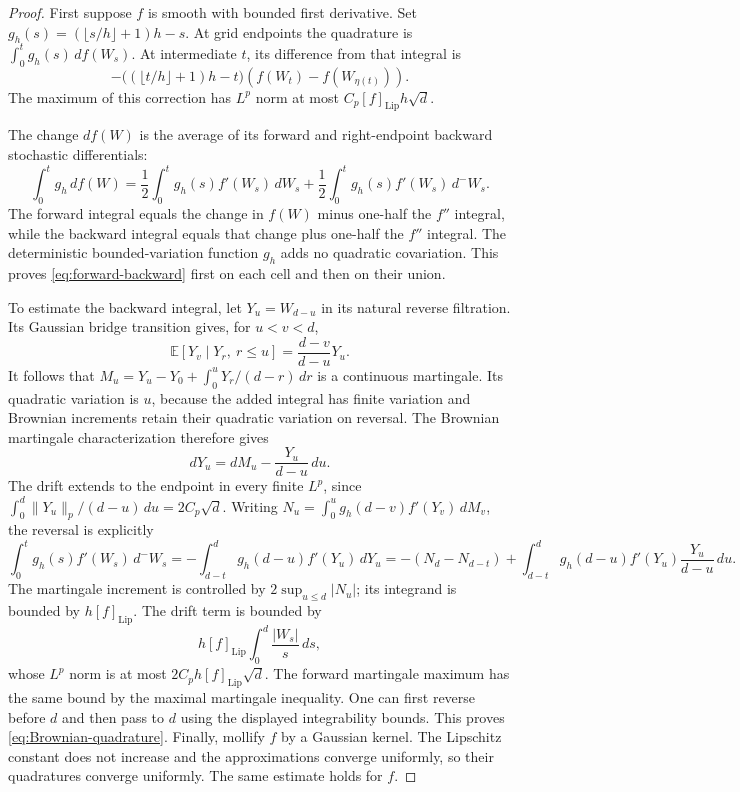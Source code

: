 \documentclass[11pt]{article}
\theoremstyle{remark}
\newcommand{\E}{\mathbb E}
\newcommand{\norm}[1]{\lVert#1\rVert}
\newcommand{\abs}[1]{\lvert#1\rvert}
\begin{document}
\begin{proof}
First suppose \(f\) is smooth with bounded first derivative.
Set \(g_h(s)=(\lfloor s/h\rfloor+1)h-s\).
At grid endpoints the quadrature is \(\int_0^t g_h(s)\,df(W_s)\).
At intermediate \(t\), its difference from that integral is
\[
 -\bigl((\lfloor t/h\rfloor+1)h-t\bigr)
          (f(W_t)-f(W_{\eta(t)})).
\]
The maximum of this correction has \(L^p\) norm at most
\(C_p[f]_{\mathrm{Lip}}h\sqrt d\).

The change \(df(W)\) is the average of its forward and right-endpoint
backward stochastic differentials:
\begin{equation}\label{eq:forward-backward}
 \int_0^t g_h\,df(W)
 =\frac12\int_0^t g_h(s)f'(W_s)\,dW_s
  +\frac12\int_0^t g_h(s)f'(W_s)\,d^-W_s.
\end{equation}
The forward integral equals the change in \(f(W)\) minus
one-half the \(f''\) integral, while the backward integral equals that
change plus one-half the \(f''\) integral. The deterministic
bounded-variation function \(g_h\) adds no quadratic covariation.
This proves \eqref{eq:forward-backward} first on each cell and then
on their union.

To estimate the backward integral, let \(Y_u=W_{d-u}\) in its natural
reverse filtration. Its Gaussian bridge transition gives, for \(u<v<d\),
\[
 \E[Y_v\mid Y_r,\ r\le u]=\frac{d-v}{d-u}Y_u.
\]
It follows that
\(M_u=Y_u-Y_0+\int_0^uY_r/(d-r)\,dr\) is a continuous martingale.
Its quadratic variation is \(u\), because the added integral has
finite variation and Brownian increments retain their quadratic
variation on reversal. The Brownian martingale characterization
therefore gives
\[
 dY_u=dM_u-\frac{Y_u}{d-u}\,du.
\]
The drift extends to the endpoint in every finite \(L^p\), since
\(\int_0^d\norm{Y_u}_p/(d-u)\,du=2C_p\sqrt d\).
Writing
\(N_u=\int_0^u g_h(d-v)f'(Y_v)\,dM_v\), the reversal is explicitly
\[
 \int_0^t g_h(s)f'(W_s)\,d^-W_s
 =-\int_{d-t}^d g_h(d-u)f'(Y_u)\,dY_u
 =-(N_d-N_{d-t})
   +\int_{d-t}^d g_h(d-u)f'(Y_u)\frac{Y_u}{d-u}\,du .
\]
The martingale increment is controlled by \(2\sup_{u\le d}|N_u|\);
its integrand is bounded by \(h[f]_{\mathrm{Lip}}\).
The drift term is bounded by
\[
 h[f]_{\mathrm{Lip}}\int_0^d\frac{\abs{W_s}}s\,ds,
\]
whose \(L^p\) norm is at most \(2C_p h[f]_{\mathrm{Lip}}\sqrt d\).
The forward martingale maximum has the same bound by the maximal
martingale inequality. One can first reverse before \(d\) and then
pass to \(d\) using the displayed integrability bounds.
This proves \eqref{eq:Brownian-quadrature}.
Finally, mollify \(f\) by a Gaussian kernel. The Lipschitz constant
does not increase and the approximations converge uniformly, so their
quadratures converge uniformly. The same estimate holds for \(f\).
\end{proof}
\end{document}
